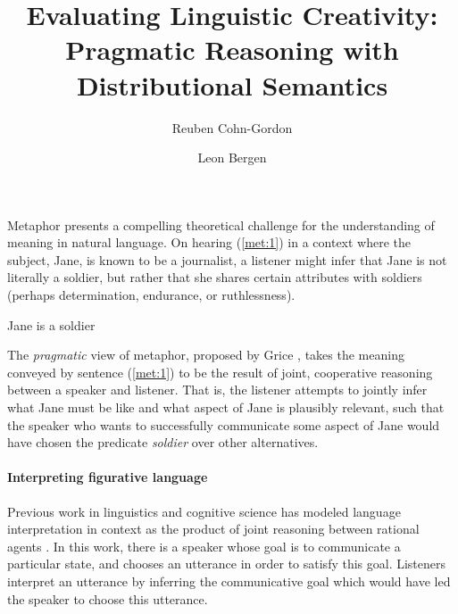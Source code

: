 \documentclass[9pt,twocolumn,twoside,lineno]{pnas-new}
\title{Evaluating Linguistic Creativity:\\ Pragmatic Reasoning with Distributional Semantics}
\author[a]{Reuben Cohn-Gordon}
\author[b]{Leon Bergen}
\affil[a]{Stanford University}
\affil[b]{University of California San Diego}
\begin{document}
\maketitle
\thispagestyle{firststyle}


Metaphor presents a compelling theoretical challenge for the understanding of meaning in natural language. On hearing (\ref{met:1}) in a context where the subject, Jane, is known to be a journalist, a listener might infer that Jane is not literally a soldier, but rather that she shares certain attributes with soldiers (perhaps determination, endurance, or ruthlessness). 
	\begin{examples}
	\item Jane is a soldier \label{met:1}
	\end{examples}

The \emph{pragmatic} view of metaphor, proposed by Grice \cite{grice}, takes the meaning conveyed by sentence (\ref{met:1}) to be the result of joint, cooperative reasoning between a speaker and listener. That is, the listener attempts to jointly infer what Jane must be like and what aspect of Jane is plausibly relevant, such that the speaker who wants to successfully communicate some aspect of Jane would have chosen the predicate \emph{soldier} over other alternatives.




\paragraph{Interpreting figurative language}
Previous work in linguistics and cognitive science has modeled language interpretation in context as the product of joint reasoning between rational agents \cite{frank2012predicting}. In this work, there is a speaker whose goal is to communicate a particular state, and chooses an utterance in order to satisfy this goal. Listeners interpret an utterance by inferring the communicative goal which would have led the speaker to choose this utterance. 
\end{document}
